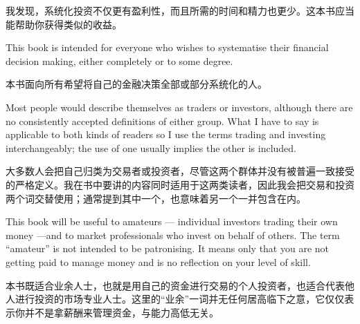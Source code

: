 \begin{chineseblock}我发现，系统化投资不仅更有盈利性，而且所需的时间和精力也更少。这本书应当能帮助你获得类似的收益。\end{chineseblock}


\begin{englishblock} This book is intended for everyone who wishes to systematise their financial decision making, either completely or to some degree. \end{englishblock}

\begin{chineseblock}本书面向所有希望将自己的金融决策全部或部分系统化的人。\end{chineseblock}

\bipairgap

\begin{englishblock} Most people would describe themselves as traders or investors, although there are no consistently accepted definitions of either group. What I have to say is applicable to both kinds of readers so I use the terms trading and investing interchangeably; the use of one usually implies the other is included. \end{englishblock}

\begin{chineseblock}大多数人会把自己归类为交易者或投资者，尽管这两个群体并没有被普遍一致接受的严格定义。我在书中要讲的内容同时适用于这两类读者，因此我会把交易和投资两个词交替使用；通常提到其中一个，也意味着另一个一并包含在内。\end{chineseblock}

\bipairgap

\begin{englishblock} This book will be useful to amateurs --- individual investors trading their own money ---and to market professionals who invest on behalf of others. The term ``amateur'' is not intended to be patronising. It means only that you are not getting paid to manage money and is no reflection on your level of skill. \end{englishblock}

\begin{chineseblock}本书既适合业余人士，也就是用自己的资金进行交易的个人投资者，也适合代表他人进行投资的市场专业人士。这里的“业余”一词并无任何居高临下之意，它仅仅表示你并不是拿薪酬来管理资金，与能力高低无关。\end{chineseblock}

